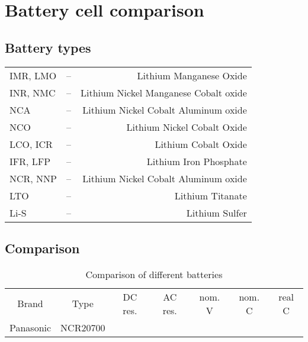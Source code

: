 \documentclass[11pt]{article}
\begin{document}
\section*{Battery cell comparison}

\subsection*{Battery types}

\begin{tabular}{lcr}
    IMR, LMO &--& Lithium Manganese Oxide \\
    INR, NMC &--& Lithium Nickel Manganese Cobalt oxide \\
    NCA      &--& Lithium Nickel Cobalt Aluminum oxide \\
    NCO      &--& Lithium Nickel Cobalt Oxide \\
    LCO, ICR &--& Lithium Cobalt Oxide \\
    IFR, LFP &--& Lithium Iron Phosphate \\
    NCR, NNP &--& Lithium Nickel Cobalt Aluminum oxide \\
    LTO      &--& Lithium Titanate \\
    Li-S     &--& Lithium Sulfer
\end{tabular}

\subsection*{Comparison}

\begin{table}[h!]
    \centering
    \begin{tabular}{c c c c c c c}
        \hline \hline
        Brand & Type & DC res. & AC res. & nom. V & nom. C & real C\\
        Panasonic & NCR20700 & 
        \hline
    \end{tabular}
    \caption{Comparison of different batteries}
\end{table}
\end{document}
